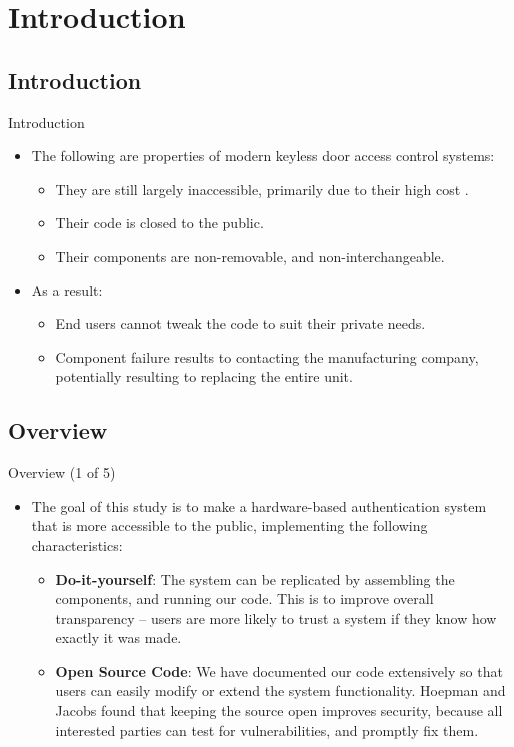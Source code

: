 \section{Introduction}
\subsection{Introduction}
\begin{frame}{Introduction}
\begin{itemize}
    \item<1-> The following are properties of modern keyless door access control systems:
    \begin{itemize}
    	\item<2-> They are still largely inaccessible, primarily due to their high cost .
    	\item<3-> Their code is closed to the public.
    	\item<4-> Their components are non-removable, and non-interchangeable.
    \end{itemize}
    \item<5-> As a result:
    \begin{itemize}
    	\item<6-> End users cannot tweak the code to suit their private needs.
    	\item<7-> Component failure results to contacting the manufacturing company, potentially resulting to replacing the entire unit.
    \end{itemize}
\end{itemize}
\end{frame}

\subsection{Overview}
\begin{frame}{Overview (1 of 5)}
\begin{itemize}
    \item<1-> The goal of this study is to make a hardware-based authentication system that is more accessible to the public, implementing the following characteristics:
    \begin{itemize}
    	\item<2-> \textbf{Do-it-yourself}: The system can be replicated by assembling the components, and running our code. This is to improve overall transparency -- users are more likely to trust a system if they know how exactly it was made.
    	\item<3-> \textbf{Open Source Code}: We have documented our code extensively so that users can easily modify or extend the system functionality. Hoepman and Jacobs  found that keeping the source open improves security, because all interested parties can test for vulnerabilities, and promptly fix them.
    \end{itemize}
\end{itemize}
\end{frame}

